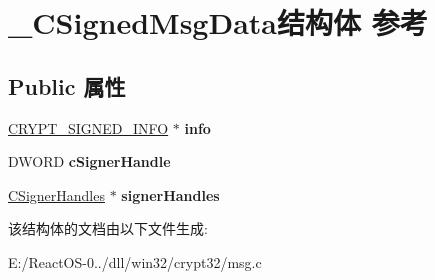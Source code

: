 \hypertarget{struct___c_signed_msg_data}{}\section{\+\_\+\+C\+Signed\+Msg\+Data结构体 参考}
\label{struct___c_signed_msg_data}
\subsection*{Public 属性}
\begin{DoxyCompactItemize}
\item 
\mbox{\label{struct___c_signed_msg_data_ae651f5e70659a673cc966df00b75e873}} 
\hyperlink{struct___c_r_y_p_t___s_i_g_n_e_d___i_n_f_o}{C\+R\+Y\+P\+T\+\_\+\+S\+I\+G\+N\+E\+D\+\_\+\+I\+N\+FO} $\ast$ {\bfseries info}
\item 
\mbox{\label{struct___c_signed_msg_data_ae7916650f9be7ad16f713d54c1c6085a}} 
D\+W\+O\+RD {\bfseries c\+Signer\+Handle}
\item 
\mbox{\label{struct___c_signed_msg_data_a89cd28b08b6ba1273a68aa05d0393973}} 
\hyperlink{struct___c_signer_handles}{C\+Signer\+Handles} $\ast$ {\bfseries signer\+Handles}
\end{DoxyCompactItemize}


该结构体的文档由以下文件生成\+:\begin{DoxyCompactItemize}
\item 
E\+:/\+React\+O\+S-\/0../dll/win32/crypt32/msg.\+c\end{DoxyCompactItemize}
